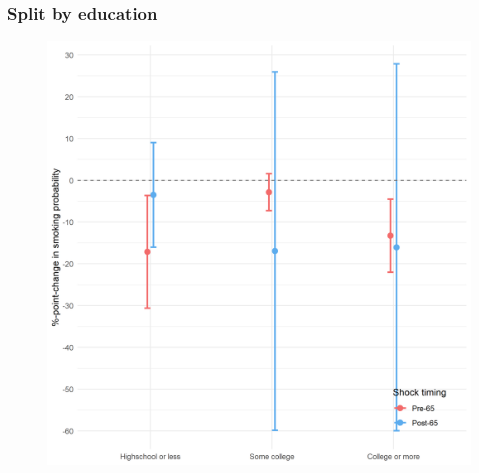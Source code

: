 \documentclass[10pt,compress,xcolor=dvipsnames,aspectratio=169]{beamer}    %
\newcounter{ex}
\newcommand{\1}[1]{\mathrm{1\hspace*{-2.5pt}l}[#1]}	%
\begin{document}
\begin{frame}
\frametitle{Split by education}

\begin{figure}[hbtp]
\centering
\includegraphics[height=0.8\textheight]{../../3_output/shock_effects/edu_6070_100_cvplot.png}
\label{fig:edu}
\end{figure}
\hyperlink{frame:otherX}{}
\end{frame}
\end{document}
